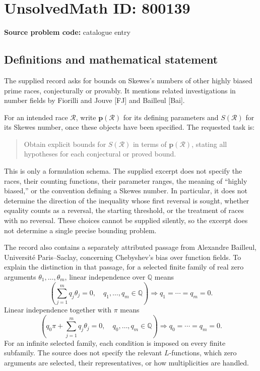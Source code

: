\documentclass[11pt]{article}
\newcommand{\Q}{\mathbb{Q}}
\begin{document}
\section*{UnsolvedMath ID: 800139}
\textbf{Source problem code:} catalogue entry
\subsection{Definitions and mathematical statement}
The supplied record asks for bounds on Skewes's numbers of other highly biased prime races, conjecturally or provably. It mentions related investigations in number fields by Fiorilli and Jouve [FJ] and Bailleul [Bai].

For an intended race \(\mathcal R\), write \(\mathbf p(\mathcal R)\) for its defining parameters and \(S(\mathcal R)\) for its Skewes number, once these objects have been specified. The requested task is:
\begin{quote}
Obtain explicit bounds for \(S(\mathcal R)\) in terms of \(\mathbf p(\mathcal R)\), stating all hypotheses for each conjectural or proved bound.
\end{quote}
This is only a formulation schema. The supplied excerpt does not specify the races, their counting functions, their parameter ranges, the meaning of ``highly biased,'' or the convention defining a Skewes number. In particular, it does not determine the direction of the inequality whose first reversal is sought, whether equality counts as a reversal, the starting threshold, or the treatment of races with no reversal. These choices cannot be supplied silently, so the excerpt does not determine a single precise bounding problem.

The record also contains a separately attributed passage from Alexandre Bailleul, Universit\'e Paris--Saclay, concerning Chebyshev's bias over function fields. To explain the distinction in that passage, for a selected finite family of real zero arguments \(\theta_1,\ldots,\theta_m\), linear independence over \(\Q\) means
\[
\left(\sum_{j=1}^{m}q_j\theta_j=0,\quad q_1,\ldots,q_m\in\Q\right)
\Longrightarrow q_1=\cdots=q_m=0.
\]
Linear independence together with \(\pi\) means
\[
\left(q_0\pi+\sum_{j=1}^{m}q_j\theta_j=0,\quad q_0,\ldots,q_m\in\Q\right)
\Longrightarrow q_0=\cdots=q_m=0.
\]
For an infinite selected family, each condition is imposed on every finite subfamily. The source does not specify the relevant \(L\)-functions, which zero arguments are selected, their representatives, or how multiplicities are handled.
\end{document}
